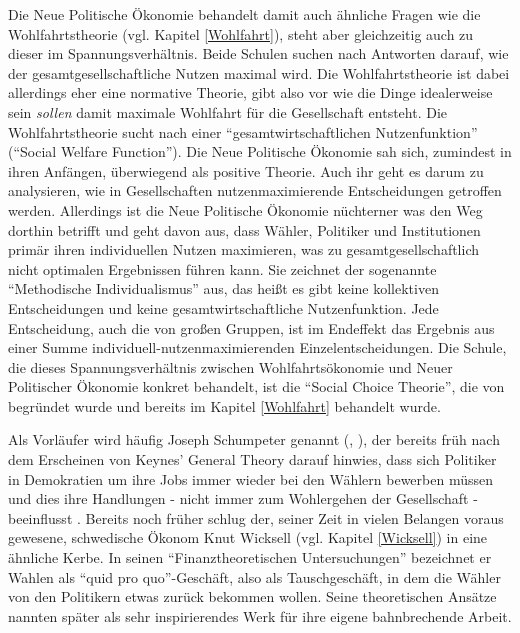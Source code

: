 Die Neue Politische Ökonomie behandelt damit auch ähnliche Fragen wie die Wohlfahrtstheorie (vgl. Kapitel \ref{Wohlfahrt}), steht aber gleichzeitig auch zu dieser im Spannungsverhältnis. Beide Schulen suchen nach Antworten darauf, wie der gesamtgesellschaftliche Nutzen maximal wird. Die Wohlfahrtstheorie ist dabei allerdings eher eine normative Theorie, gibt also vor wie die Dinge idealerweise sein \textit{sollen} damit maximale Wohlfahrt für die Gesellschaft entsteht. Die Wohlfahrtstheorie sucht nach einer "`gesamtwirtschaftlichen Nutzenfunktion"' ("`Social Welfare Function"'). Die Neue Politische Ökonomie sah sich, zumindest in ihren Anfängen, überwiegend als positive Theorie. Auch ihr geht es darum zu analysieren, wie in Gesellschaften nutzenmaximierende Entscheidungen getroffen werden. Allerdings ist die Neue Politische Ökonomie nüchterner was den Weg dorthin betrifft und geht davon aus, dass Wähler, Politiker und Institutionen primär ihren individuellen Nutzen maximieren, was zu gesamtgesellschaftlich nicht optimalen Ergebnissen führen kann. Sie zeichnet der sogenannte "`Methodische Individualismus"' aus, das heißt es gibt keine kollektiven Entscheidungen und keine gesamtwirtschaftliche Nutzenfunktion. Jede Entscheidung, auch die von großen Gruppen, ist im Endeffekt das Ergebnis aus einer Summe individuell-nutzenmaximierenden Einzelentscheidungen. Die Schule, die dieses Spannungsverhältnis zwischen Wohlfahrtsökonomie und Neuer Politischer Ökonomie konkret behandelt, ist die "`Social Choice Theorie"', die von \textcite{Arrow1950, Arrow1951} begründet wurde und bereits im Kapitel \ref{Wohlfahrt} behandelt wurde.

Als Vorläufer wird häufig Joseph Schumpeter genannt (\textcite[S. 519]{Snowdon2005}, \textcite[S. 95]{Warsh}), der bereits früh nach dem Erscheinen von Keynes' General Theory darauf hinwies, dass sich Politiker in Demokratien  um ihre Jobs immer wieder bei den Wählern bewerben müssen und dies ihre Handlungen - nicht immer zum Wohlergehen der Gesellschaft - beeinflusst \parencite{Schumpeter1942}. Bereits noch früher schlug der, seiner Zeit in vielen Belangen voraus gewesene, schwedische Ökonom Knut Wicksell (vgl. Kapitel \ref{Wicksell}) in eine ähnliche Kerbe. In seinen "`Finanztheoretischen Untersuchungen"' \parencite{Wicksell1896} bezeichnet er Wahlen als "`quid pro quo"'-Geschäft, also als Tauschgeschäft, in dem die Wähler von den Politikern etwas zurück bekommen wollen. Seine theoretischen Ansätze nannten \textcite[S. 8]{Buchanan1962} später als sehr inspirierendes Werk für ihre eigene bahnbrechende Arbeit.

